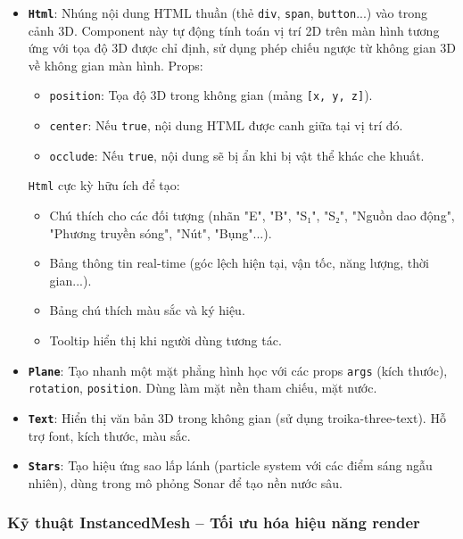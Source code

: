 \begin{itemize}
    \item \textbf{\texttt{Html}}: Nhúng nội dung HTML thuần (thẻ \texttt{div}, \texttt{span}, \texttt{button}...) vào trong cảnh 3D. Component này tự động tính toán vị trí 2D trên màn hình tương ứng với tọa độ 3D được chỉ định, sử dụng phép chiếu ngược từ không gian 3D về không gian màn hình. Props:
    \begin{itemize}
        \item \texttt{position}: Tọa độ 3D trong không gian (mảng \texttt{[x, y, z]}).
        \item \texttt{center}: Nếu \texttt{true}, nội dung HTML được canh giữa tại vị trí đó.
        \item \texttt{occlude}: Nếu \texttt{true}, nội dung sẽ bị ẩn khi bị vật thể khác che khuất.
    \end{itemize}
    \texttt{Html} cực kỳ hữu ích để tạo:
    \begin{itemize}
        \item Chú thích cho các đối tượng (nhãn "E", "B", "S₁", "S₂", "Nguồn dao động", "Phương truyền sóng", "Nút", "Bụng"...).
        \item Bảng thông tin real-time (góc lệch hiện tại, vận tốc, năng lượng, thời gian...).
        \item Bảng chú thích màu sắc và ký hiệu.
        \item Tooltip hiển thị khi người dùng tương tác.
    \end{itemize}
    
    \item \textbf{\texttt{Plane}}: Tạo nhanh một mặt phẳng hình học với các props \texttt{args} (kích thước), \texttt{rotation}, \texttt{position}. Dùng làm mặt nền tham chiếu, mặt nước.
    
    \item \textbf{\texttt{Text}}: Hiển thị văn bản 3D trong không gian (sử dụng troika-three-text). Hỗ trợ font, kích thước, màu sắc.
    
    \item \textbf{\texttt{Stars}}: Tạo hiệu ứng sao lấp lánh (particle system với các điểm sáng ngẫu nhiên), dùng trong mô phỏng Sonar để tạo nền nước sâu.
\end{itemize}

\subsubsection{Kỹ thuật InstancedMesh – Tối ưu hóa hiệu năng render}

